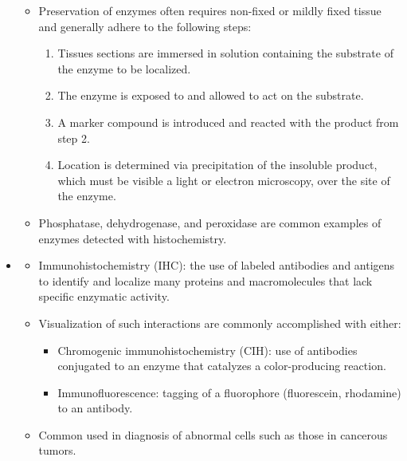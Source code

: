 \begin{itemize}
\begin{itemize}
      \item Preservation of enzymes often requires non-fixed or mildly fixed tissue and generally adhere to the following steps:
        \begin{enumerate}
          \item Tissues sections are immersed in solution containing the substrate of the enzyme to be localized.
          \item The enzyme is exposed to and allowed to act on the substrate.
          \item A marker compound is introduced and reacted with the product from step 2.
          \item Location is determined via precipitation of the insoluble product, which must be visible a light or electron microscopy, over the site of the enzyme.
        \end{enumerate}
      \item Phosphatase, dehydrogenase, and peroxidase are common examples of enzymes detected with histochemistry.
    \end{itemize}
  \item {}
    \begin{itemize}
      \item Immunohistochemistry (IHC): the use of labeled antibodies and antigens to identify and localize many proteins and macromolecules that lack specific enzymatic activity. 
      \item Visualization of such interactions are commonly  accomplished with either:
        \begin{itemize}
          \item Chromogenic immunohistochemistry (CIH): use of antibodies conjugated to an enzyme that catalyzes a color-producing reaction.
          \item Immunofluorescence: tagging of a fluorophore (fluorescein, rhodamine) to an antibody. 
        \end{itemize}
      \item Common used in diagnosis of abnormal cells such as those in cancerous tumors. 
    \end{itemize}
\end{itemize}

